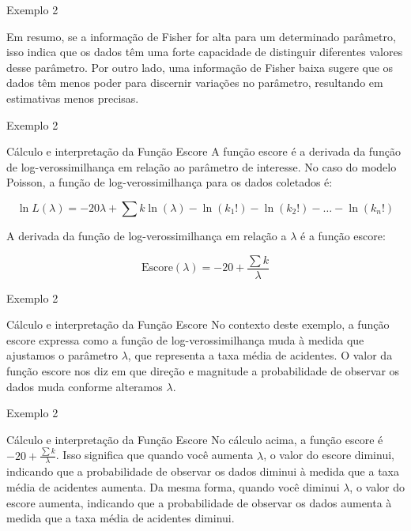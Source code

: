 \documentclass[12pt]{beamer}
\begin{document}
\begin{frame}{Exemplo 2}
\begin{block}{}
\justifying
Em resumo, se a informação de Fisher for alta para um determinado parâmetro, isso indica que os dados têm uma forte capacidade de distinguir diferentes valores desse parâmetro. Por outro lado, uma informação de Fisher baixa sugere que os dados têm menos poder para discernir variações no parâmetro, resultando em estimativas menos precisas.
\end{block}
\end{frame}

\begin{frame}{Exemplo 2}
\begin{block}{Cálculo e interpretação da Função Escore}
\justifying
A função escore é a derivada da função de log-verossimilhança em relação ao parâmetro de interesse. No caso do modelo Poisson, a função de log-verossimilhança para os dados coletados é:

\[
\ln L(\lambda) = -20\lambda + \sum{k} \ln(\lambda) - \ln(k_1!) - \ln(k_2!) - \ldots - \ln(k_n!)
\]

A derivada da função de log-verossimilhança em relação a $\lambda$ é a função escore:

\[
\text{Escore}(\lambda) = -20 + \frac{\sum{k}}{\lambda}
\]
\end{block}
\end{frame}

\begin{frame}{Exemplo 2}
\begin{block}{Cálculo e interpretação da Função Escore}
\justifying
No contexto deste exemplo, a função escore expressa como a função de log-verossimilhança muda à medida que ajustamos o parâmetro $\lambda$, que representa a taxa média de acidentes. O valor da função escore nos diz em que direção e magnitude a probabilidade de observar os dados muda conforme alteramos $\lambda$.
\end{block}
\end{frame}

\begin{frame}{Exemplo 2}
\begin{block}{Cálculo e interpretação da Função Escore}
\justifying
No cálculo acima, a função escore é $-20 + \frac{\sum{k}}{\lambda}$. Isso significa que quando você aumenta $\lambda$, o valor do escore diminui, indicando que a probabilidade de observar os dados diminui à medida que a taxa média de acidentes aumenta. Da mesma forma, quando você diminui $\lambda$, o valor do escore aumenta, indicando que a probabilidade de observar os dados aumenta à medida que a taxa média de acidentes diminui.
\end{block}
\end{frame}
\end{document}
